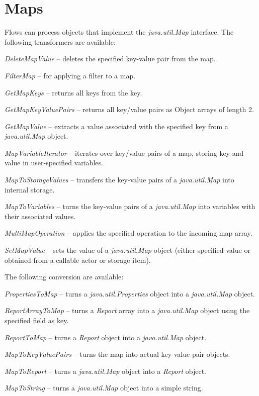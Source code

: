 \clearpage
\section{Maps}
Flows can process objects that implement the \textit{java.util.Map} interface.
The following transformers are available:
\begin{tight_itemize}
	\item \textit{DeleteMapValue} -- deletes the specified key-value pair from the map.
	\item \textit{FilterMap} -- for applying a filter to a map.
	\item \textit{GetMapKeys} -- returns all keys from the key.
	\item \textit{GetMapKeyValuePairs} -- returns all key/value pairs as Object arrays of length 2.
	\item \textit{GetMapValue} -- extracts a value associated with the
	specified key from a \textit{java.util.Map} object.
    \item \textit{MapVariableIterator} -- iterates over key/value pairs of a map,
    storing key and value in user-specified variables.
	\item \textit{MapToStorageValues} -- transfers the key-value pairs of a
	\textit{java.util.Map} into internal storage.
	\item \textit{MapToVariables} -- turns the key-value pairs of a
	\textit{java.util.Map} into variables with their associated values.
	\item \textit{MultiMapOperation} -- applies the specified operation to
	the incoming map array.
	\item \textit{SetMapValue} -- sets the value of a \textit{java.util.Map}
	object (either specified value or obtained from a callable actor or storage item).
\end{tight_itemize}
The following conversion are available:
\begin{tight_itemize}
	\item \textit{PropertiesToMap} -- turns a \textit{java.util.Properties}
	object into a \textit{java.util.Map} object.
	\item \textit{ReportArrayToMap} -- turns a \textit{Report} array into a
	\textit{java.util.Map} object using the specified field as key.
	\item \textit{ReportToMap} -- turns a \textit{Report} object into a
	\textit{java.util.Map} object.
	\item \textit{MapToKeyValuePairs} -- turns the map into actual
	key-value pair objects.
  \item \textit{MapToReport} -- turns a \textit{java.util.Map} object into a
  \textit{Report} object.
  \item \textit{MapToString} -- turns a \textit{java.util.Map} object into a
  simple string.
\end{tight_itemize}


